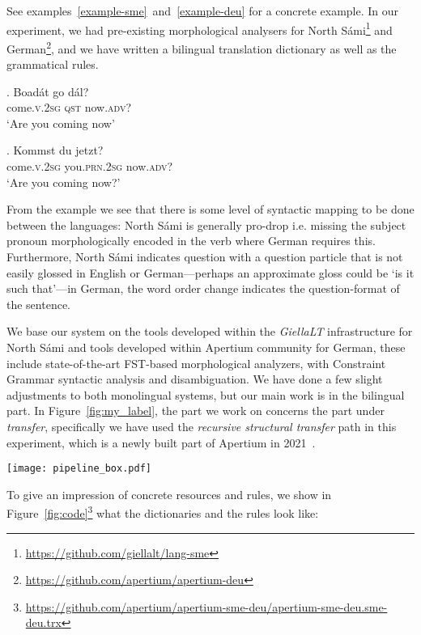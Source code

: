 \documentclass{flammie}
\begin{document}
See examples~\ref{example-sme}~and~\ref{example-deu} for a concrete example.  In
our experiment, we had pre-existing morphological analysers for North
Sámi\footnote{\url{https://github.com/giellalt/lang-sme}} and
German\footnote{\url{https://github.com/apertium/apertium-deu}}, and we have
written a bilingual translation dictionary as well as the grammatical rules.

\exg.  Boadát go dál?\label{example-sme}\\
come\textsc{.v.2sg} \textsc{qst} now\textsc{.adv}?\\
`Are you coming now'

\exg.  Kommst du jetzt?\label{example-deu}\\
come\textsc{.v.2sg} you\textsc{.prn.2sg} now\textsc{.adv}?\\
`Are you coming now?'

From the example we see that there is some level of syntactic mapping to be done
between the languages: North Sámi is generally pro-drop i.e. missing the subject
pronoun morphologically encoded in the verb where German requires this.
Furthermore, North Sámi indicates question with a question particle that is not
easily glossed in English or German---perhaps an approximate gloss could be `is
it such that'---in German, the word order change indicates the question-format
of the sentence.

We base our system on the tools developed within the \textit{GiellaLT}
infrastructure for North Sámi and tools developed within Apertium community for
German, these include state-of-the-art FST-based morphological analyzers, with
Constraint Grammar syntactic analysis and disambiguation. We have done a few
slight adjustments to both monolingual systems, but our main work is in the
bilingual part. In Figure~\ref{fig:my_label}, the part we work on concerns the
part under \textit{transfer}, specifically we have used the \textit{recursive
structural transfer} path in this experiment, which is a newly built part of
Apertium in 2021~\cite{khanna2021apertium}.

\begin{figure*}[htb]
    \centering
    \texttt{[image: pipeline\_box.pdf]}
    \caption{Apertium pipeline structure from \cite{khanna2021apertium}
    \label{fig:my_label}}
\end{figure*}

To give an impression of concrete resources and rules, we show in
Figure~\ref{fig:code}\footnote{\url{https://github.com/apertium/apertium-sme-deu/apertium-sme-deu.sme-deu.trx}}
what the dictionaries and the rules look like:
\end{document}
